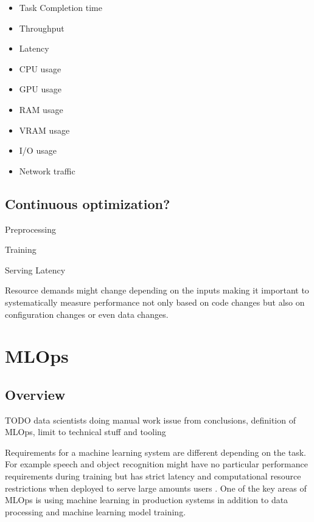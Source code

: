 \begin{itemize}
    \item Task Completion time
    \item Throughput
    \item Latency
    \item CPU usage
    \item GPU usage
    \item RAM usage
    \item VRAM usage
    \item I/O usage
    \item Network traffic
\end{itemize}

\subsection{Continuous optimization?}

Preprocessing

Training

Serving Latency

Resource demands might change depending on the inputs \parencite{brunnertPerformanceorientedDevOpsResearch2015} making it important to systematically measure performance not only based on code changes but also on configuration changes or even data changes.

\section{MLOps} %
\label{sec:mldevops}

\subsection{Overview}

TODO \parencite{kreuzbergerMachineLearningOperations2022} data scientists doing manual work issue from conclusions, definition of MLOps, limit to technical stuff and tooling

Requirements for a machine learning system are different depending on the task. For example speech and object recognition might have no particular performance requirements during training but has strict latency and computational resource restrictions when deployed to serve large amounts users \parencite{hintonDistillingKnowledgeNeural2015}. One of the key areas of MLOps is using machine learning in production systems in addition to data processing and machine learning model training.

